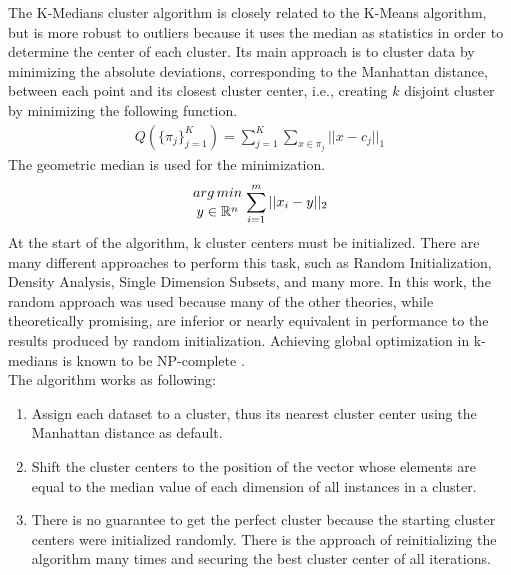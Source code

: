 The K-Medians cluster algorithm is closely related to the K-Means algorithm, but is more robust to outliers because it uses the median as statistics in order to determine the center of each cluster. Its main approach is to cluster data by minimizing the absolute deviations, corresponding to the Manhattan distance, between each point and its closest cluster center, i.e., creating $k$ disjoint cluster by minimizing the following function. \cite{kmed}
\begin{align}
    Q(\{\pi_j\}^K_{j=1}) = \sum_{j=1}^{K}\sum_{x \in \pi_j}||x-c_j||_1
\end{align}
The geometric median is used for the minimization.
\begin{align}
    {{arg\, min}\atop{y\in\mathbb{R}^n}} \sum_{i=1}^m ||x_i-y||_2
\end{align}
At the start of the algorithm, k cluster centers must be initialized. There are many different approaches to perform this task, such as Random Initialization, Density Analysis, Single Dimension Subsets, and many more. In this work, the random approach was used because many of the other theories, while theoretically promising, are inferior or nearly equivalent in performance to the results produced by random initialization. \cite{kmed} Achieving global optimization in k-medians is known to be NP-complete \cite{kmed_time}.\\ 
The algorithm works as following:\cite{algo_kmed}
\begin{enumerate}
    \item Assign each dataset to a cluster, thus its nearest cluster center using the Manhattan distance as default.
    \item Shift the cluster centers to the position of the vector whose elements are equal to the median value of each dimension of all instances in a cluster.
    \item There is no guarantee to get the perfect cluster because the starting cluster centers were initialized randomly. There is the approach of reinitializing the algorithm many times and securing the best cluster center of all iterations.
\end{enumerate}